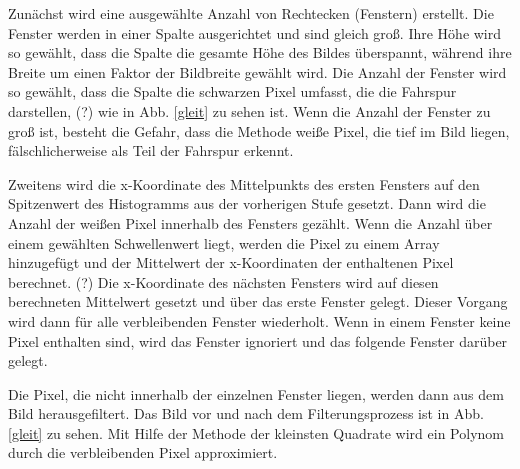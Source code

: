 \documentclass[arbeit=studie,oneside,BCOR=12mm]{ArbeitRST}
\begin{document}
Zunächst wird eine ausgewählte Anzahl von Rechtecken (Fenstern) erstellt. Die
Fenster werden in einer Spalte ausgerichtet und sind gleich groß. Ihre Höhe
wird so gewählt, dass die Spalte die gesamte Höhe des Bildes überspannt,
während ihre Breite um einen Faktor der Bildbreite gewählt wird. Die Anzahl der
Fenster wird so gewählt, dass die Spalte die schwarzen Pixel umfasst, die die
Fahrspur darstellen, (?) wie in Abb. \ref{gleit} zu sehen ist. Wenn die Anzahl der
Fenster zu groß ist, besteht die Gefahr, dass die Methode weiße Pixel, die tief
im Bild liegen, fälschlicherweise als Teil der Fahrspur erkennt. 

Zweitens wird die x-Koordinate des Mittelpunkts des ersten Fensters auf den
Spitzenwert des Histogramms aus der vorherigen Stufe gesetzt. Dann wird die
Anzahl der weißen Pixel innerhalb des Fensters gezählt. Wenn die Anzahl über
einem gewählten Schwellenwert liegt, werden die Pixel zu einem Array
hinzugefügt und der Mittelwert der x-Koordinaten der enthaltenen Pixel
berechnet. (?) Die x-Koordinate des nächsten Fensters wird auf diesen
berechneten Mittelwert gesetzt und über das erste Fenster gelegt. Dieser
Vorgang wird dann für alle verbleibenden Fenster wiederholt. Wenn in einem
Fenster keine Pixel enthalten sind, wird das Fenster ignoriert und das folgende
Fenster darüber gelegt.  

Die Pixel, die nicht innerhalb der einzelnen Fenster liegen, werden dann aus
dem Bild herausgefiltert. Das Bild vor und nach dem Filterungsprozess ist in
Abb. \ref{gleit} zu sehen. Mit Hilfe der Methode der kleinsten Quadrate wird ein
Polynom durch die verbleibenden Pixel approximiert.
\end{document}
